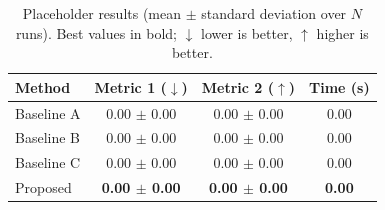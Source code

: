 \begin{table}[t]
  \centering
  \caption{Placeholder results (mean $\pm$ standard deviation over $N$ runs). Best values in bold; $\downarrow$ lower is better, $\uparrow$ higher is better.}
  \label{tab:results}
  \small
  \setlength{\tabcolsep}{5pt}
  \begin{tabular}{@{}lccc@{}}
    \toprule
    Method       & Metric 1 ($\downarrow$)   & Metric 2 ($\uparrow$)     & Time (s)                  \\
    \midrule
    Baseline A   & 0.00 $\pm$ 0.00           & 0.00 $\pm$ 0.00           & 0.00                      \\
    Baseline B   & 0.00 $\pm$ 0.00           & 0.00 $\pm$ 0.00           & 0.00                      \\
    Baseline C   & 0.00 $\pm$ 0.00           & 0.00 $\pm$ 0.00           & 0.00                      \\
    Proposed     & \textbf{0.00 $\pm$ 0.00}  & \textbf{0.00 $\pm$ 0.00}  & \textbf{0.00}             \\
    \bottomrule
  \end{tabular}
\end{table}
